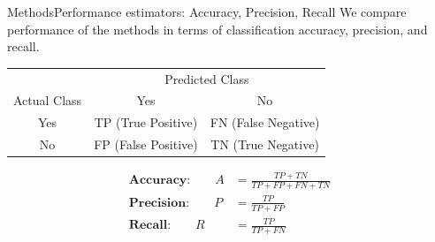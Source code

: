 \documentclass[xcolor=table]{beamer}
\numberwithin{figure}{section}
\numberwithin{equation}{section}
\begin{document}
\begin{frame}{Methods}{Performance estimators: Accuracy, Precision, Recall}
We compare performance of the methods in terms of classification accuracy, precision, and recall.
\begin{table}[]
\begin{tabular}{|c|c|c|}
\hline
                               & \multicolumn{2}{c|}{Predicted Class}                                                      \\ \cline{2-3} 
\multirow{-2}{*}{Actual Class} & \cellcolor[HTML]{CBCEFB}Yes                 & \cellcolor[HTML]{CBCEFB}No                  \\ \hline
\cellcolor[HTML]{CBCEFB}Yes    & \cellcolor[HTML]{32CB00}TP (True Positive)  & \cellcolor[HTML]{FD6864}FN (False Negative) \\ \hline
\cellcolor[HTML]{CBCEFB}No     & \cellcolor[HTML]{FD6864}FP (False Positive) & \cellcolor[HTML]{32CB00}TN (True Negative)  \\ \hline
\end{tabular}
\end{table}
\begin{equation*}
\begin{split}
\textbf{Accuracy:}\qquad A&=\frac{TP+TN}{TP+FP+FN+TN} \\
\textbf{Precision:}\qquad P&=\frac{TP}{TP+FP}\\
\textbf{Recall:}\qquad R&=\frac{TP}{TP+FN}
\end{split}
\end{equation*}
\end{frame}
\end{document}
